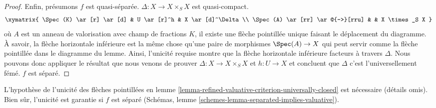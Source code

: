 \begin{proof}
Enfin, présumons $f$ est quasi-séparée. $\Delta : X \to X \times_S X$
est quasi-compact.
$$
\xymatrix{
\Spec(K) \ar[r] \ar[d] & U \ar[r]^h & X \ar[d]^\Delta \\
\Spec(A) \ar[rr] \ar@{-->}[rru] & & X \times_S X
}
$$
où $A$ est un anneau de valorisation avec champ de fractions $K$, il existe une flèche pointillée unique faisant le déplacement du diagramme. À savoir, la flèche horizontale inférieure est la même chose qu'une paire de morphismes
$\Spec(A) \to X$ qui peut servir comme la flèche pointillée dans le diagramme du lemme. Ainsi, l'unicité requise montre que la flèche horizontale inférieure facteurs à travers $\Delta$. Nous pouvons donc appliquer le résultat que nous venons de prouver
$\Delta : X \to X \times_S X$ et $h : U \to X$ et concluent que
$\Delta$ c'est l'universellement fémé. $f$
est séparé.

\end{proof}

\begin{remark}

\label{remark-check-val-on-open}

L'hypothèse de l'unicité des flèches pointillées en lemme \ref{lemma-refined-valuative-criterion-universally-closed}
est nécessaire (détails omis). Bien sûr, l'unicité est garantie si
$f$ est séparé (Schémas, lemme \ref{schemes-lemma-separated-implies-valuative}).

\end{remark}

